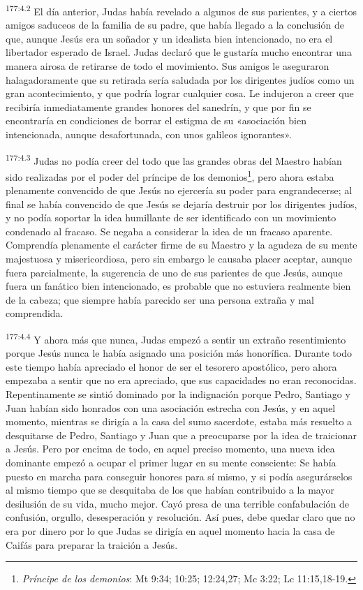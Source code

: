 \par 
\textsuperscript{177:4.2} El día anterior, Judas había revelado a algunos de sus parientes, y a ciertos amigos saduceos de la familia de su padre, que había llegado a la conclusión de que, aunque Jesús era un soñador y un idealista bien intencionado, no era el libertador esperado de Israel. Judas declaró que le gustaría mucho encontrar una manera airosa de retirarse de todo el movimiento. Sus amigos le aseguraron halagadoramente que su retirada sería saludada por los dirigentes judíos como un gran acontecimiento, y que podría lograr cualquier cosa. Le indujeron a creer que recibiría inmediatamente grandes honores del sanedrín, y que por fin se encontraría en condiciones de borrar el estigma de su «asociación bien intencionada, aunque desafortunada, con unos galileos ignorantes».

\par 
\textsuperscript{177:4.3} Judas no podía creer del todo que las grandes obras del Maestro habían sido realizadas por el poder del príncipe de los demonios\footnote{\textit{Príncipe de los demonios}: Mt 9:34; 10:25; 12:24,27; Mc 3:22; Lc 11:15,18-19.}, pero ahora estaba plenamente convencido de que Jesús no ejercería su poder para engrandecerse; al final se había convencido de que Jesús se dejaría destruir por los dirigentes judíos, y no podía soportar la idea humillante de ser identificado con un movimiento condenado al fracaso. Se negaba a considerar la idea de un fracaso aparente. Comprendía plenamente el carácter firme de su Maestro y la agudeza de su mente majestuosa y misericordiosa, pero sin embargo le causaba placer aceptar, aunque fuera parcialmente, la sugerencia de uno de sus parientes de que Jesús, aunque fuera un fanático bien intencionado, es probable que no estuviera realmente bien de la cabeza; que siempre había parecido ser una persona extraña y mal comprendida.

\par 
\textsuperscript{177:4.4} Y ahora más que nunca, Judas empezó a sentir un extraño resentimiento porque Jesús nunca le había asignado una posición más honorífica. Durante todo este tiempo había apreciado el honor de ser el tesorero apostólico, pero ahora empezaba a sentir que no era apreciado, que sus capacidades no eran reconocidas. Repentinamente se sintió dominado por la indignación porque Pedro, Santiago y Juan habían sido honrados con una asociación estrecha con Jesús, y en aquel momento, mientras se dirigía a la casa del sumo sacerdote, estaba más resuelto a desquitarse de Pedro, Santiago y Juan que a preocuparse por la idea de traicionar a Jesús. Pero por encima de todo, en aquel preciso momento, una nueva idea dominante empezó a ocupar el primer lugar en su mente consciente: Se había puesto en marcha para conseguir honores para sí mismo, y si podía asegurárselos al mismo tiempo que se desquitaba de los que habían contribuido a la mayor desilusión de su vida, mucho mejor. Cayó presa de una terrible confabulación de confusión, orgullo, desesperación y resolución. Así pues, debe quedar claro que no era por dinero por lo que Judas se dirigía en aquel momento hacia la casa de Caifás para preparar la traición a Jesús.

